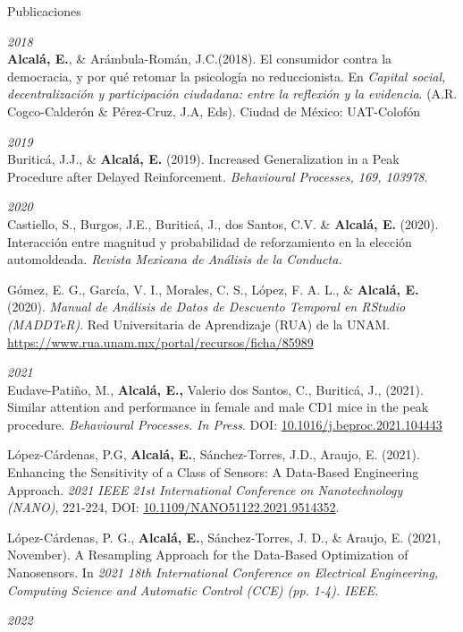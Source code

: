 \documentclass{resume} %
\begin{document}

\begin{rSection}{Publicaciones}

{\em 2018} \\
{\bf Alcalá, E.}, \& Arámbula-Román, J.C.(2018). El consumidor contra la democracia, y por qué retomar la psicología no reduccionista. En \textit{Capital social, decentralización y participación ciudadana: entre la reflexión y la evidencia}. (A.R. Cogco-Calderón \& Pérez-Cruz, J.A, Eds). Ciudad de México: UAT-Colofón

{\em 2019} \\
Buriticá, J.J., \& \textbf{Alcalá, E.} (2019). Increased Generalization in a Peak Procedure after Delayed Reinforcement. \textit{Behavioural Processes, 169, 103978}.

{\em 2020} \\
Castiello, S., Burgos, J.E., Buriticá, J., dos Santos, C.V. \& \textbf{Alcalá, E.} (2020). Interacción entre magnitud y probabilidad de reforzamiento en la elección automoldeada. \textit{Revista Mexicana de Análisis de la Conducta.}

Gómez, E. G., García, V. I., Morales, C. S., López, F. A. L., \& \textbf{Alcalá, E.} (2020). \textit{Manual de Análisis de Datos de Descuento Temporal en RStudio (MADDTeR)}. Red Universitaria de Aprendizaje (RUA) de la UNAM. \url{https://www.rua.unam.mx/portal/recursos/ficha/85989}

{\em 2021} \\

Eudave-Patiño, M., \textbf{Alcalá, E.,} Valerio dos Santos, C., Buriticá, J., (2021). Similar attention and performance in female and male CD1 mice in the peak procedure. \textit{Behavioural Processes. In Press}. DOI: \url{10.1016/j.beproc.2021.104443}

López-Cárdenas, P.G, \textbf{Alcalá, E.}, Sánchez-Torres, J.D., Araujo, E. (2021). Enhancing the Sensitivity of a Class of Sensors: A Data-Based Engineering Approach. \textit{2021 IEEE 21st International Conference on Nanotechnology (NANO)}, 221-224, DOI: \url{10.1109/NANO51122.2021.9514352}. 

López-Cárdenas, P. G.,\textbf{ Alcalá, E.}, Sánchez-Torres, J. D., \& Araujo, E. (2021, November). A Resampling Approach for the Data-Based Optimization of Nanosensors. In \textit{2021 18th International Conference on Electrical Engineering, Computing Science and Automatic Control (CCE) (pp. 1-4). IEEE.}

{\em 2022}\\ 


\end{rSection}
\end{document}
